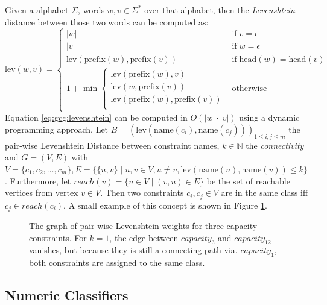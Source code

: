 			Given a alphabet $\Sigma$, words $w, v \in \Sigma^*$ over that alphabet, then the \textit{Levenshtein} distance between those two words can be computed as:
			\begin{equation}
				\label{eq:gcg:levenshtein}
				\mathrm{lev}(w, v) = \begin{cases}
					|w| & \mathrm{if} \; v = \epsilon \\
					|v| & \mathrm{if} \; w = \epsilon \\
					\mathrm{lev}(\mathrm{prefix}(w), \mathrm{prefix}(v)) & \mathrm{if} \; \mathrm{head}(w) = \mathrm{head}(v) \\
					1 + \min \begin{cases}
						\mathrm{lev}(\mathrm{prefix}(w), v) \\
						\mathrm{lev}(w, \mathrm{prefix}(v)) \\
						\mathrm{lev}(\mathrm{prefix}(w), \mathrm{prefix}(v)) \\
					\end{cases} & \mathrm{otherwise}
				\end{cases}
			\end{equation}
			Equation \ref{eq:gcg:levenshtein} can be computed in $O(|w| \cdot |v|)$ using a dynamic programming approach.
			Let $B = (\mathrm{lev}(\mathrm{name}(c_i), \mathrm{name}(c_j)))_{1 \leq i,j \leq m}$ the pair-wise Levenshtein Distance between constraint names, $k \in \mathbb{N}$ the \textit{connectivity} and $G = (V, E)$ with $V = \{ c_1, c_2, \ldots, c_m \}, E = \{ \{ u, v \} \mid u, v \in V, u \neq v, \mathrm{lev}(\mathrm{name}(u), \mathrm{name}(v)) \leq k \}$.
			Furthermore, let $reach(v) = \{ u \in V \mid (v, u) \in E \}$ be the set of reachable vertices from vertex $v \in V$.
			Then two constraints $c_i, c_j \in V$ are in the same class iff $c_j \in reach(c_i)$.
			A small example of this concept is shown in Figure \ref{fig:gcg:levenshtein}.
			
			\begin{figure}[ht!]
				\centering
				
				\caption{The graph of pair-wise Levenshtein weights for three capacity constraints. For $k=1$, the edge between $capacity_3$ and $capacity_{12}$ vanishes, but because they is still a connecting path via. $capacity_1$, both constraints are assigned to the same class.}
				\label{fig:gcg:levenshtein}
			\end{figure}
		
		\subsection{Numeric Classifiers}
			
